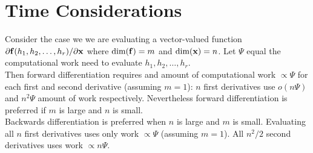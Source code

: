 \section{Time Considerations}
Consider the case we we are evaluating a vector-valued function $\partial {\bf f}(h_1,h_2,\hdots,h_r)/\partial {\bf x}$ where $\hbox{dim}({\bf f}) = m$ and $\hbox{dim}({\bf x}) = n$. Let $\Psi$ equal the computational work need to evaluate $h_1, h_2, \hdots, h_r$.\\

Then forward differentiation requires and amount of computational work $\propto \Psi$ for each first and second derivative (assuming $m=1$): $n$ first derivatives use $o(n\Psi)$ and $n^2\Psi$ amount of 
work respectively. Nevertheless forward differentiation is preferred if $m$ is large and $n$ is small.\\

Backwards differentiation is preferred when $n$ is large and $m$ is small. Evaluating all $n$ first derivatives uses only work $\propto \Psi$ (assuming $m=1$). All $n^2/2$ second derivatives uses work 
$\propto n\Psi$.


